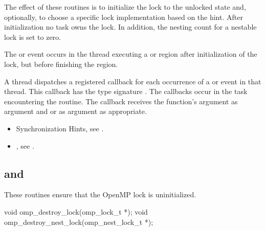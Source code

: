 \effect
The effect of these routines is to initialize the lock to the unlocked state and, optionally, to choose a specific lock implementation based on the hint.
After initialization no task owns the lock. In addition, the nesting count for a nestable lock is set to zero.

\events

The  or  event occurs in the thread
executing a  or  region
after initialization of the lock, but before finishing the region.

\tools

A thread dispatches a registered 
callback for each occurrence of a  or  event
in that thread.  This callback has the type signature .
The callbacks occur in the task encountering the routine.
The callback receives the function's  argument as
 argument and
 or
  as  argument as appropriate.

\crossreferences
\begin{itemize}
\item Synchronization Hints, see .
\item {}, see
.
\end{itemize}



\subsection[\hcode{omp_destroy_lock} and \hcode{omp_destroy_nest_lock}]{ and\\ }
\label{subsec:omp_destroy_lock and omp_destroy_nest_lock}
\summary
These routines ensure that the OpenMP lock is uninitialized.

\format
\begin{ccppspecific}
\begin{ompcFunction}
void omp_destroy_lock(omp_lock_t *);
void omp_destroy_nest_lock(omp_nest_lock_t *);
\end{ompcFunction}
\end{ccppspecific}

